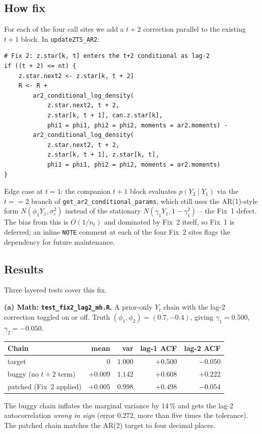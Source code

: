 \documentclass[11pt]{article}
\begin{document}
\subsection{How fix}

For each of the four call sites we add a $t+2$ correction parallel to the
existing $t+1$ block. In \texttt{updateZTS\_AR2}:
\begin{lstlisting}
# Fix 2: z.star[k, t] enters the t+2 conditional as lag-2
if ((t + 2) <= nt) {
    z.star.next2 <- z.star[k, t + 2]
    R <- R +
        ar2_conditional_log_density(
            z.star.next2, t + 2,
            z.star[k, t + 1], can.z.star[k],
            phi1 = phi1, phi2 = phi2, moments = ar2.moments) -
        ar2_conditional_log_density(
            z.star.next2, t + 2,
            z.star[k, t + 1], z.star[k, t],
            phi1 = phi1, phi2 = phi2, moments = ar2.moments)
}
\end{lstlisting}
Edge case at $t = 1$: the companion $t+1$ block evaluates
$p(Y_2 \mid Y_1)$ via the $t == 2$ branch of
\texttt{get\_ar2\_conditional\_params}, which still uses the AR(1)-style form
$N(\phi_1 Y_1, \sigma_\epsilon^2)$ instead of the stationary
$N(\gamma_1 Y_1, 1 - \gamma_1^2)$ -- the Fix~1 defect. The bias from this is
$O(1/n_t)$ and dominated by Fix~2 itself, so Fix~1 is deferred; an inline
\texttt{NOTE} comment at each of the four Fix~2 sites flags the dependency
for future maintenance.

\subsection{Results}

Three layered tests cover this fix.

\textbf{(a) Math: \texttt{test\_fix2\_lag2\_mh.R}.} A prior-only $Y_t$ chain
with the lag-2 correction toggled on or off. Truth
$(\phi_1, \phi_2) = (0.7, -0.4)$, giving $\gamma_1 = 0.500$, $\gamma_2 = -0.050$.
\begin{center}
\begin{tabular}{lrrrr}
\toprule
\textbf{Chain}            & mean      & var       & lag-1 ACF & lag-2 ACF \\
\midrule
target                    & $0$       & $1.000$   & $+0.500$  & $-0.050$  \\
buggy   (no $t+2$ term)   & $+0.009$  & $1.142$   & $+0.608$  & $+0.222$  \\
patched (Fix~2 applied)   & $+0.005$  & $0.998$   & $+0.498$  & $-0.054$  \\
\bottomrule
\end{tabular}
\end{center}
The buggy chain inflates the marginal variance by 14\,\% and gets the lag-2
autocorrelation \emph{wrong in sign} (error $0.272$, more than five times the
tolerance). The patched chain matches the AR(2) target to four decimal
places.
\end{document}
